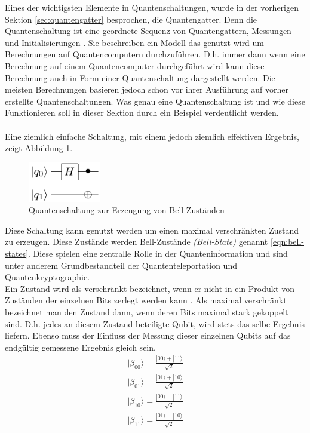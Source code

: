 Eines der wichtigsten Elemente in Quantenschaltungen, wurde in der vorherigen Sektion \ref{sec:quantengatter} besprochen, die Quantengatter. Denn die Quantenschaltung ist eine geordnete Sequenz von Quantengattern, Messungen und Initialisierungen \cite{Qiskit-Textbook}. Sie beschreiben ein Modell das genutzt wird um Berechnungen auf Quantencomputern durchzuf\"uhren. D.h. immer dann wenn eine Berechnung auf einem Quantencomputer durchgef\"uhrt wird kann diese Berechnung auch in Form einer Quantenschaltung dargestellt werden. Die meisten Berechnungen basieren jedoch schon vor ihrer Ausf\"uhrung auf vorher erstellte Quantenschaltungen. Was genau eine Quantenschaltung ist und wie diese Funktionieren soll in dieser Sektion durch ein Beispiel verdeutlicht werden.\\\\
Eine ziemlich einfache Schaltung, mit einem jedoch ziemlich effektiven Ergebnis, zeigt Abbildung \ref{fig:bell-circuit}.
\begin{figure}[h]
  \centering
  \includegraphics[width=0.28\textwidth]{figures/bell.pdf}
  \caption{Quantenschaltung zur Erzeugung von Bell-Zust\"anden}
  \label{fig:bell-circuit}
\end{figure}
Diese Schaltung kann genutzt werden um einen maximal verschr\"ankten Zustand zu erzeugen. Diese Zust\"ande werden Bell-Zust\"ande \textit{(Bell-State)} genannt \ref{eqn:bell-states}. Diese spielen eine zentralle Rolle in der Quanteninformation und sind unter anderem Grundbestandteil der Quantenteleportation und Quantenkryptographie.\\
Ein Zustand wird als verschr\"ankt bezeichnet, wenn er nicht in ein Produkt von Zust\"anden der einzelnen Bits zerlegt werden kann \cite{Homeister-2022}. Als maximal verschr\"ankt bezeichnet man den Zustand dann, wenn deren Bits maximal stark gekoppelt sind. D.h. jedes an diesem Zustand beteiligte Qubit, wird stets das selbe Ergebnis liefern. Ebenso muss der Einfluss der Messung dieser einzelnen Qubits auf das endg\"ultig gemessene Ergebnis gleich sein.
\begin{equation}
  \begin{aligned} \label{eqn:bell-states}
    |\beta_{00}\rangle = \frac{|00\rangle + |11\rangle}{\sqrt{2}}\\
    |\beta_{01}\rangle = \frac{|01\rangle + |10\rangle}{\sqrt{2}}\\
    |\beta_{10}\rangle = \frac{|00\rangle - |11\rangle}{\sqrt{2}}\\
    |\beta_{11}\rangle = \frac{|01\rangle - |10\rangle}{\sqrt{2}} 
  \end{aligned}
\end{equation}
